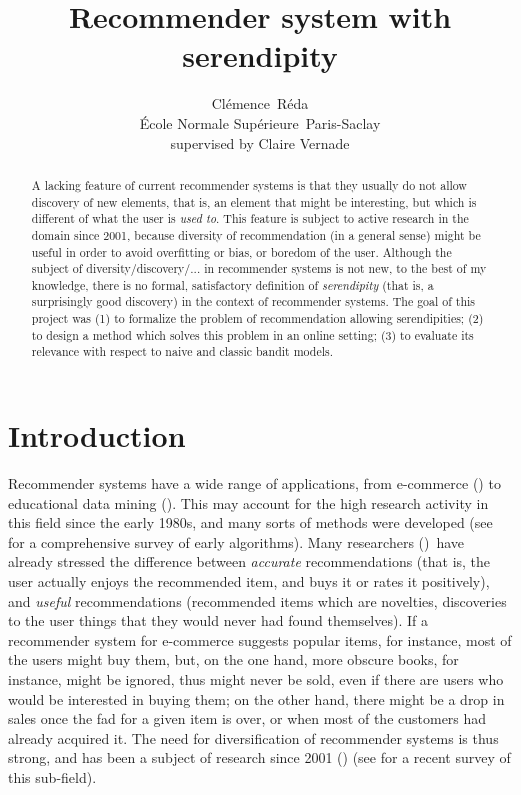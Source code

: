 \documentclass{article}
\title{Recommender system with serendipity}
\author{
  Cl\'{e}mence~R\'{e}da\\
  \'{E}cole Normale Supérieure~Paris-Saclay\\
  supervised by Claire Vernade\\
}
\begin{document}

\maketitle

\begin{abstract}
A lacking feature of current recommender systems is that they usually do not allow discovery of new elements, that is, an element that might be interesting, but which is different of what the user is \textit{used to}. This feature is subject to active research in the domain since 2001, because diversity of recommendation (in a general sense) might be useful in order to avoid overfitting or bias, or boredom of the user. Although the subject of diversity/discovery/... in recommender systems is not new, to the best of my knowledge, there is no formal, satisfactory definition of \textit{serendipity} (that is, a surprisingly good discovery) in the context of recommender systems. The goal of this project was (1) to formalize the problem of recommendation allowing serendipities; (2) to design a method which solves this problem in an online setting; (3) to evaluate its relevance with respect to naive and classic bandit models.
\end{abstract}

\section{Introduction}

Recommender systems have a wide range of applications, from e-commerce (\cite{smith2017two}) to educational data mining (\cite{tang2003smart}). This may account for the high research activity in this field since the early 1980s, and many sorts of methods were developed (see \cite{adomavicius2005toward} for a comprehensive survey of early algorithms). Many researchers (\cite{abbassi2009getting,kunaver2017diversity,zhou2010solving}) have already stressed the difference between \textit{accurate} recommendations (that is, the user actually enjoys the recommended item, and buys it or rates it positively), and \textit{useful} recommendations (recommended items which are novelties, discoveries to the user things that they would never had found themselves). If a recommender system for e-commerce suggests popular items, for instance, most of the users might buy them, but, on the one hand, more obscure books, for instance, might be ignored, thus might never be sold, even if there are users who would be interested in buying them; on the other hand, there might be a drop in sales once the fad for a given item is over, or when most of the customers had already acquired it. The need for diversification of recommender systems is thus strong, and has been a subject of research since 2001 (\cite{bradley2001improving}) (see \cite{kunaver2017diversity} for a recent survey of this sub-field).
\end{document}
